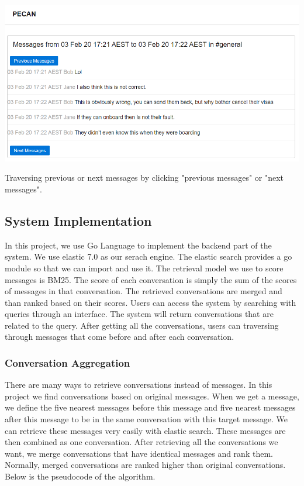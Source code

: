 \includegraphics[scale=0.2]{traversing}

Traversing previous or next messages by clicking "previous messages" or "next messages".
\bigbreak

\subsection{System Implementation}
In this project, we use Go Language to implement the backend part of the system. We use elastic 7.0 as our serach engine. The elastic search provides a go module so that we can import and use it. The retrieval model we use to score messages is BM25. The score of each conversation is simply the sum of the scores of messages in that conversation. The retrieved conversations are merged and than ranked based on their scores. Users can access the system by searching with queries through an interface. The system will return conversations that are related to the query. After getting all the conversations, users can traversing through messages that come before and after each conversation.

\subsubsection{Conversation Aggregation}
There are many ways to retrieve conversations instead of messages. In this project we find conversations based on original messages. When we get a message, we define the five nearest messages before this message and five nearest messages after this message to be in the same conversation with this target message. We can retrieve these messages very easily with elastic search. These messages are then combined as one conversation. After retrieving all the conversations we want, we merge conversations that have identical messages and rank them. Normally, merged conversations are ranked higher than original conversations. Below is the pseudocode of the algorithm.

